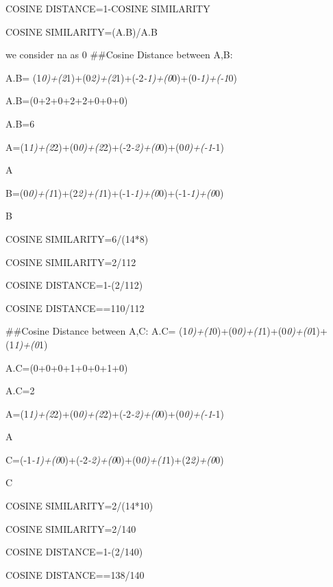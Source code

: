 \documentclass[
]{article}
\begin{document}
COSINE DISTANCE=1-COSINE SIMILARITY

COSINE
SIMILARITY=(A.B)/\textbar\textbar A\textbar\textbar.\textbar\textbar B\textbar\textbar{}

we consider na as 0 \#\#Cosine Distance between A,B:

A.B=
(1\emph{0)+(2}1)+(0\emph{2)+(2}1)+(-2\emph{-1)+(0}0)+(0\emph{-1)+(-1}0)

A.B=(0+2+0+2+2+0+0+0)

A.B=6

\textbar\textbar A\textbar\textbar=(1\emph{1)+(2}2)+(0\emph{0)+(2}2)+(-2\emph{-2)+(0}0)+(0\emph{0)+(-1}-1)

\textbar\textbar A\textbar{}

\textbar\textbar B\textbar\textbar=(0\emph{0)+(1}1)+(2\emph{2)+(1}1)+(-1\emph{-1)+(0}0)+(-1\emph{-1)+(0}0)

\textbar\textbar B\textbar{}

COSINE SIMILARITY=6/(14*8)

COSINE SIMILARITY=2/112

COSINE DISTANCE=1-(2/112)

COSINE DISTANCE==110/112

\#\#Cosine Distance between A,C: A.C=
(1\emph{0)+(1}0)+(0\emph{0)+(1}1)+(0\emph{0)+(0}1)+(1\emph{1)+(0}1)

A.C=(0+0+0+1+0+0+1+0)

A.C=2

\textbar\textbar A\textbar\textbar=(1\emph{1)+(2}2)+(0\emph{0)+(2}2)+(-2\emph{-2)+(0}0)+(0\emph{0)+(-1}-1)

\textbar\textbar A\textbar{}

\textbar\textbar C\textbar\textbar=(-1\emph{-1)+(0}0)+(-2\emph{-2)+(0}0)+(0\emph{0)+(1}1)+(2\emph{2)+(0}0)

\textbar\textbar C\textbar{}

COSINE SIMILARITY=2/(14*10)

COSINE SIMILARITY=2/140

COSINE DISTANCE=1-(2/140)

COSINE DISTANCE==138/140
\end{document}
